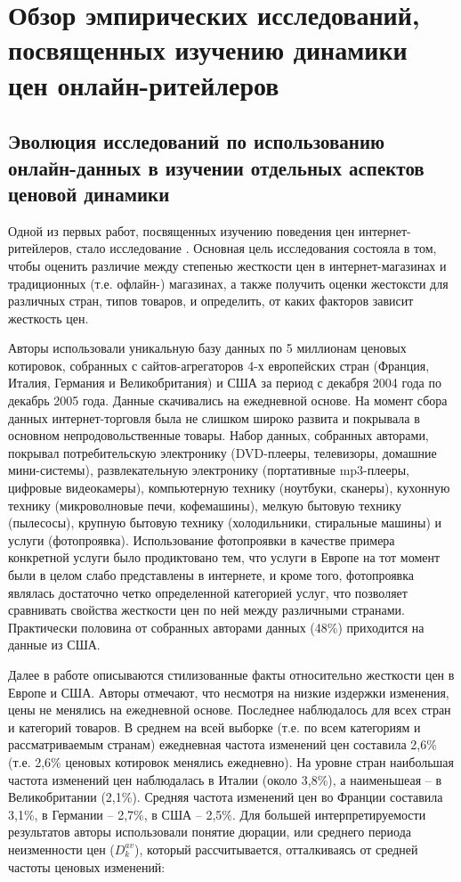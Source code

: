 \chapter{Обзор эмпирических исследований, посвященных изучению динамики цен онлайн-ритейлеров}\label{ch:ch1}

\section{Эволюция исследований по использованию онлайн-данных в изучении отдельных аспектов ценовой динамики}\label{sec:ch1/sec1}

Одной из первых работ, посвященных изучению поведения цен интернет-ритейлеров, стало исследование \cite{RePEc:ecb:ecbwps:2006645}. Основная цель исследования состояла в том, чтобы оценить различие между степенью жесткости цен в интернет-магазинах и традиционных (т.е. офлайн-) магазинах, а также получить оценки жестоксти для различных стран, типов товаров, и определить, от каких факторов зависит жесткость цен.

Авторы использовали уникальную базу данных по 5 миллионам ценовых котировок, собранных с сайтов-агрегаторов 4-х европейских стран (Франция, Италия, Германия и Великобритания) и США за период с декабря 2004 года по декабрь 2005 года. Данные скачивались на ежедневной основе. На момент сбора данных интернет-торговля была не слишком широко развита и покрывала в основном непродовольственные товары. Набор данных, собранных авторами, покрывал потребительскую электронику (DVD-плееры, телевизоры, домашние мини-системы), развлекательную электронику (портативные mp3-плееры, цифровые видеокамеры), компьютерную технику (ноутбуки, сканеры), кухонную технику (микроволновые печи, кофемашины), мелкую бытовую технику (пылесосы), крупную бытовую технику (холодильники, стиральные машины) и услуги (фотопроявка). Использование фотопроявки в качестве примера конкретной услуги было продиктовано тем, что услуги в Европе на тот момент были в целом слабо представлены в интернете, и кроме того, фотопроявка являлась достаточно четко определенной категорией услуг, что позволяет сравнивать свойства жесткости цен по ней между различными странами. Практически половина от собранных авторами данных (48\%) приходится на данные из США.

Далее в работе описываются стилизованные факты относительно жесткости цен в Европе и США. Авторы отмечают, что несмотря на низкие издержки изменения, цены не менялись на ежедневной основе. Последнее наблюдалось для всех стран и категорий товаров. В среднем на всей выборке (т.е. по всем категориям и рассматриваемым странам) ежедневная частота изменений цен составила 2,6\% (т.е. 2,6\% ценовых котировок менялись ежедневно). На уровне стран наибольшая частота изменений цен наблюдалась в Италии (около 3,8\%), а наименьшеая – в Великобритании (2,1\%). Средняя частота изменений цен во Франции составила 3,1\%, в Германии – 2,7\%, в США – 2,5\%. Для большей интерпретируемости результатов авторы использовали понятие дюрации, или среднего периода неизменности цен ($D^{av}_{k}$), который рассчитывается, отталкиваясь от средней частоты ценовых изменений:

